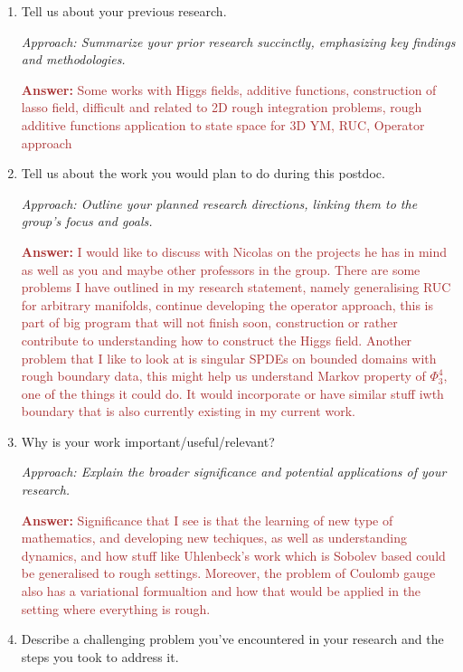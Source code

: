 \documentclass[12pt]{article}
\numberwithin{equation}{section}
\newcommand{\brown}[1]{\textcolor{brown}{#1}}
\begin{document}
\begin{enumerate}
     \item Tell us about your previous research.
    
    \textit{Approach: Summarize your prior research succinctly, emphasizing key findings and methodologies.}

    \brown{\textbf{Answer:} Some works with Higgs fields, additive functions, construction of lasso field, difficult and related to 2D rough integration problems, rough additive functions application to state space for 3D YM, RUC, Operator approach}
    
    \item Tell us about the work you would plan to do during this postdoc.
    
    \textit{Approach: Outline your planned research directions, linking them to the group's focus and goals.}

    \brown{\textbf{Answer:} I would like to discuss with Nicolas on the projects he has in mind as well as you and maybe other professors in the group. There are some problems I have outlined in my research statement, namely generalising RUC for arbitrary manifolds, continue developing the operator approach, this is part of big program that will not finish soon, construction or rather contribute to understanding how to construct the Higgs field. Another problem that I like to look at is singular SPDEs on bounded domains with rough boundary data, this might help us understand Markov property of $\Phi^4_3$, one of the things it could do. It would incorporate or have similar stuff iwth boundary that is also currently existing in my current work. }

    \item Why is your work important/useful/relevant?
    
    \textit{Approach: Explain the broader significance and potential applications of your research.}

    \brown{ \textbf{Answer:} Significance that I see is that the learning of new type of mathematics, and developing new techiques, as well as understanding dynamics, and how stuff like Uhlenbeck's work which is Sobolev based could be generalised to rough settings. Moreover, the problem of Coulomb gauge also has a variational formualtion and how that would be applied in the setting where everything is rough. 
    }

    \item Describe a challenging problem you've encountered in your research and the steps you took to address it.
    

\end{enumerate}
\end{document}
